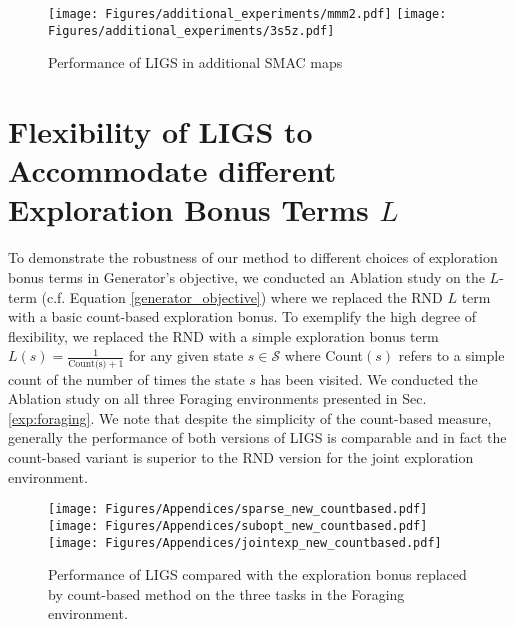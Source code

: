 \documentclass{article}
\begin{document}
\begin{figure}[h!]
    \centering
    \texttt{[image: Figures/additional\_experiments/mmm2.pdf]}
      \texttt{[image: Figures/additional\_experiments/3s5z.pdf]}
      \caption{Performance of LIGS in additional SMAC maps}
    \label{fig:smac_maps_additional}
\end{figure}

\newpage
\section{Flexibility of LIGS to Accommodate different Exploration Bonus Terms $L$}
To demonstrate the robustness of our method to different choices of exploration bonus terms in {\selectfont Generator}'s objective, we conducted an Ablation study on the $L$-term (c.f. Equation \ref{generator_objective}) where we replaced the RND $L$ term with a basic count-based exploration bonus. To exemplify the high degree of flexibility, we replaced the RND with a simple exploration bonus term  $L(s)=\frac{1}{\text{Count(s)}+1}$ for any given state $s\in\mathcal{S}$ where Count$(s)$ refers to a simple count of the number of times the state $s$ has been visited.  We conducted the Ablation study on all three Foraging environments presented in Sec. \ref{exp:foraging}. We note that despite the simplicity of the count-based measure, generally the performance of both versions of LIGS is comparable and in fact the count-based variant is superior to the RND version for the joint exploration environment.

\begin{figure}[h!]
    \centering
    \texttt{[image: Figures/Appendices/sparse\_new\_countbased.pdf]}
    \texttt{[image: Figures/Appendices/subopt\_new\_countbased.pdf]}
        \texttt{[image: Figures/Appendices/jointexp\_new\_countbased.pdf]}
    \caption{Performance of LIGS compared with  the exploration bonus replaced by count-based method on the three tasks in the Foraging environment.}
    \label{fig:count_based_comparison}
\end{figure}

\end{document}
